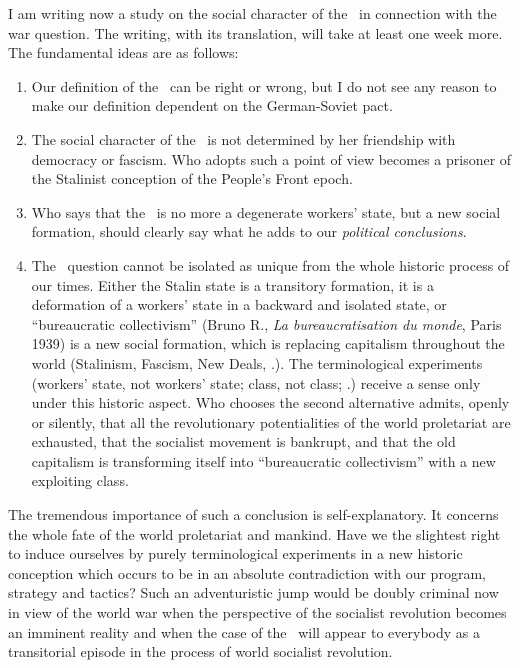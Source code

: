 

I am writing
now a study on the social character of the \USSR\ in connection with the war question. The writing, with its translation, will take at least one week more. The fundamental ideas are as follows:

\begin{enumerate}
	\item Our definition of the \USSR\ can be right or wrong, but I do not see any reason to make our definition dependent on the German-Soviet pact.
	
	\item The social character of the \USSR\ is not determined by her friendship with democracy or fascism. Who adopts such a point of view becomes a prisoner of the Stalinist conception of the People’s Front epoch.
	
	\item Who says that the \USSR\ is no more a degenerate workers’ state, but a new social formation, should clearly say what he adds to our \emph{political conclusions}.
	
	\item The \USSR\ question cannot be isolated as unique from the whole historic process of our times. Either the Stalin state is a transitory formation, it is a deformation of a workers’ state in a backward and isolated state, or “bureaucratic collectivism” (Bruno R., \emph{La bureaucratisation du monde}, Paris 1939) is a new social formation, which is replacing capitalism throughout the world (Stalinism, Fascism, New Deals, \etc.). The terminological experiments (workers’ state, not workers’ state; class, not class; \etc.) receive a sense only under this historic aspect. Who chooses the second alternative admits, openly or silently, that all the revolutionary potentialities of the world proletariat are exhausted, that the socialist movement is bankrupt, and that the old capitalism is transforming itself into “bureaucratic collectivism” with a new exploiting class.
\end{enumerate}

The tremendous importance of such a conclusion is self-expla\-na\-tory. It concerns the whole fate of the world proletariat and man\-kind. Have we the slightest right to induce ourselves by purely terminological experiments in a new historic conception which occurs to be in an absolute contradiction with our program, strategy and tactics? Such an adventuristic jump would be doubly criminal now in view of the world war when the perspective of the socialist revolution becomes an imminent reality and when the case of the \USSR\ will appear to everybody as a transitorial episode in the process of world socialist revolution.

